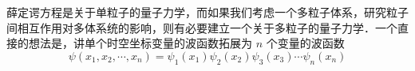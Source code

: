 

薛定谔方程是关于单粒子的量子力学，而如果我们考虑一个多粒子体系，研究粒子间相互作用对多体系统的影响，则有必要建立一个关于多粒子的量子力学．一个直接的想法是，讲单个时空坐标变量的波函数拓展为 $n$ 个变量的波函数
\begin{equation}
\psi(x_1,x_2,\cdots,x_n)=\psi_1(x_1)\psi_2(x_2)\psi_3(x_3)\cdots \psi_n(x_n)
\end{equation}
